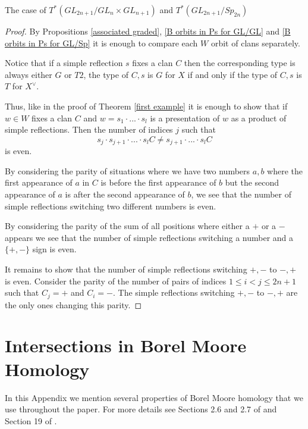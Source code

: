 \documentclass[12pt]{article}
\theoremstyle{plain}
\theoremstyle{definition}
\begin{document}
\begin{subsection}{The case of $T^*(GL_{2n+1}/GL_n\times GL_{n+1})$ and $T^*(GL_{2n+1}/Sp_{2n})$}
    \begin{proof}
    By Propositions \ref{associated graded}, \ref{B orbits in Ps for GL/GL} and \ref{B orbits in Ps for GL/Sp} it is enough to compare each $W$ orbit of clans separately.

    Notice that if a simple reflection $s$ fixes a clan $C$ then the corresponding type is always either $G$ or $T2$, the type of $C,s$ is $G$ for $X$ if and only if the type of $C,s$ is $T$ for $X^\vee$.

    Thus, like in the proof of Theorem \ref{first example} it is enough to show that if $w\in W$ fixes a clan $C$ and $w=s_1\cdot ... \cdot s_l$ is a presentation of $w$ as a product of simple reflections. Then the number of indices $j$ such that $$s_j\cdot s_{j+1}\cdot ...\cdot s_l C\neq s_{j+1}\cdot ...\cdot s_l C$$ is even.

    By considering the parity of situations where we have two numbers $a,b$ where the first appearance of $a$ in $C$ is before the first appearance of $b$ but the second appearance of $a$ is after the second appearance of $b$, we see that the number of simple reflections switching two different numbers is even. 
    
    By considering the parity of the sum of all positions where either a $+$ or a $-$ appears we see that the number of simple reflections switching a number and a $\{+,-\}$ sign is even. 

    It remains to show that the number of simple reflections switching $+,-$ to $-,+$ is even.  Consider the parity of the number of pairs of indices $1\leq i<j\leq 2n+1$ such that $C_{j}=+$ and $C_{i}=-$. The simple reflections switching $+,-$ to $-,+$ are the only ones changing this parity.
        
\end{proof}

    
\end{subsection}
    
\newpage

\appendix

\section{Intersections in Borel Moore Homology}\label{A1}

In this Appendix we mention several properties of Borel Moore homology that we use throughout the paper. For more details see Sections 2.6 and 2.7 of \cite{Chriss1997RepresentationTA} and Section 19 of \cite{FultonIntersectionTheory}.
\end{document}
